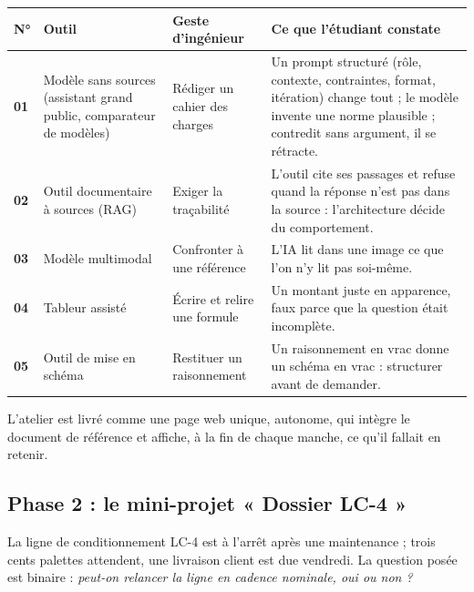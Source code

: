 \documentclass[11pt,a4paper]{article}
\begin{document}
\begin{center}
\renewcommand{\arraystretch}{1.4}
\small
\begin{tabularx}{\linewidth}{>{\bfseries}p{0.5cm} >{\raggedright\arraybackslash}p{3.1cm} >{\raggedright\arraybackslash}p{3.3cm} >{\raggedright\arraybackslash}X}
\toprule
\textbf{N°} & \textbf{Outil} & \textbf{Geste d'ingénieur} & \textbf{Ce que l'étudiant constate}\\
\midrule
01 & Modèle sans sources (assistant grand public, comparateur de modèles) & Rédiger un cahier des charges & Un prompt structuré (rôle, contexte, contraintes, format, itération) change tout ; le modèle invente une norme plausible ; contredit sans argument, il se rétracte.\\
02 & Outil documentaire à sources (RAG) & Exiger la traçabilité & L'outil cite ses passages et refuse quand la réponse n'est pas dans la source : l'architecture décide du comportement.\\
03 & Modèle multimodal & Confronter à une référence & L'IA lit dans une image ce que l'on n'y lit pas soi-même.\\
04 & Tableur assisté & Écrire et relire une formule & Un montant juste en apparence, faux parce que la question était incomplète.\\
05 & Outil de mise en schéma & Restituer un raisonnement & Un raisonnement en vrac donne un schéma en vrac : structurer avant de demander.\\
\bottomrule
\end{tabularx}
\end{center}

L'atelier est livré comme une page web unique, autonome, qui intègre le document de référence et
affiche, à la fin de chaque manche, ce qu'il fallait en retenir.

\subsection{Phase 2 : le mini-projet « Dossier LC-4 »}

La ligne de conditionnement LC-4 est à l'arrêt après une maintenance ; trois cents palettes
attendent, une livraison client est due vendredi. La question posée est binaire :
\emph{peut-on relancer la ligne en cadence nominale, oui ou non ?}
\end{document}
